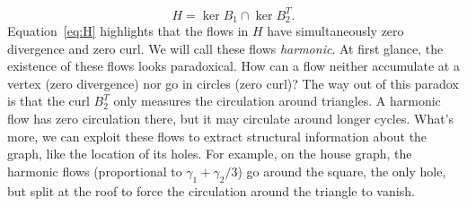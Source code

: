 \documentclass[11pt,a4paper]{article}
\theoremstyle{plain}
\theoremstyle{definition}
\begin{document}
\begin{equation}\label{eq:H}
H=\ker B_1\cap\ker B_2^T .
\end{equation}
Equation~\eqref{eq:H} highlights that the flows in $H$ have simultaneously zero divergence and zero curl. We will call these flows \emph{harmonic}. At first glance, the existence of these flows looks paradoxical. How can a flow neither accumulate at a vertex (zero divergence) nor go in circles (zero curl)? The way out of this paradox is that the curl $B_2^T$ only measures the circulation around triangles. A harmonic flow has zero circulation there, but it may circulate around longer cycles. What's more, we can exploit these flows to extract structural information about the graph, like the location of its holes. For example, on the house graph, the harmonic flows (proportional to $\gamma_1+\gamma_2/3$) go around the square, the only hole, but split at the roof to force the circulation around the triangle to vanish.
\end{document}
